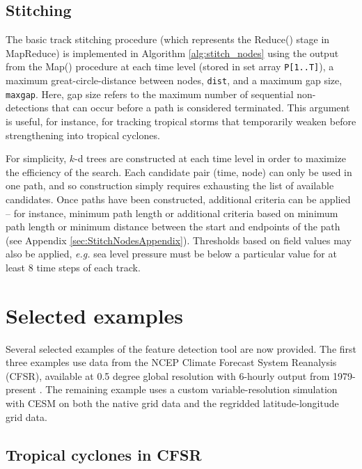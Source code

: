 \documentclass[gmdd, hvmath, online]{copernicus_discussions}
\begin{document}
\subsection{Stitching}

The basic track stitching procedure (which represents the Reduce() stage in MapReduce) is implemented in Algorithm \ref{alg:stitch_nodes} using the output from the Map() procedure at each time level (stored in set array \texttt{P[1..T]}), a maximum great-circle-distance between nodes, \texttt{dist}, and a maximum gap size, \texttt{maxgap}.  Here, gap size refers to the maximum number of sequential non-detections that can occur before a path is considered terminated.  This argument is useful, for instance, for tracking tropical storms that temporarily weaken before strengthening into tropical cyclones.

For simplicity, $k$-d trees are constructed at each time level in order to maximize the efficiency of the search.  Each candidate pair (time, node) can only be used in one path, and so construction simply requires exhausting the list of available candidates.  Once paths have been constructed, additional criteria can be applied -- for instance, minimum path length or additional criteria based on minimum path length or minimum distance between the start and endpoints of the path (see Appendix \ref{sec:StitchNodesAppendix}).  Thresholds based on field values may also be applied, \textit{e.g.} sea level pressure must be below a particular value for at least 8 time steps of each track.

\section{Selected examples} \label{sec:SelectedExamples}

Several selected examples of the feature detection tool are now provided.  The first three examples use data from the NCEP Climate Forecast System Reanalysis (CFSR), available at 0.5 degree global resolution with 6-hourly output from 1979-present \citep{saha2010ncep}.  The remaining example uses a custom variable-resolution simulation with CESM \citep{zarzycki2014multidecadal} on both the native grid data and the regridded latitude-longitude grid data.

\subsection{Tropical cyclones in CFSR} \label{sec:TropicalCycloneExample}
\end{document}
